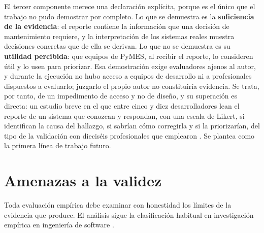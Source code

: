 El tercer componente merece una declaración explícita, porque es el único que el trabajo no pudo demostrar por completo. Lo que se demuestra es la \textbf{suficiencia de la evidencia}: el reporte contiene la información que una decisión de mantenimiento requiere, y la interpretación de los sistemas reales muestra decisiones concretas que de ella se derivan. Lo que no se demuestra es su \textbf{utilidad percibida}: que equipos de PyMES, al recibir el reporte, lo consideren útil y lo usen para priorizar. Esa demostración exige evaluadores ajenos al autor, y durante la ejecución no hubo acceso a equipos de desarrollo ni a profesionales dispuestos a evaluarlo; juzgarlo el propio autor no constituiría evidencia. Se trata, por tanto, de un impedimento de acceso y no de diseño, y su superación es directa: un estudio breve en el que entre cinco y diez desarrolladores lean el reporte de un sistema que conozcan y respondan, con una escala de Likert, si identifican la causa del hallazgo, si sabrían cómo corregirla y si la priorizarían, del tipo de la validación con dieciséis profesionales que emplearon \citet{SasAvgeriou}. Se plantea como la primera línea de trabajo futuro.

\section{Amenazas a la validez}
Toda evaluación empírica debe examinar con honestidad los límites de la evidencia que produce. El análisis sigue la clasificación habitual en investigación empírica en ingeniería de software \citep{Wohlin2012, RunesonHost2009}.


